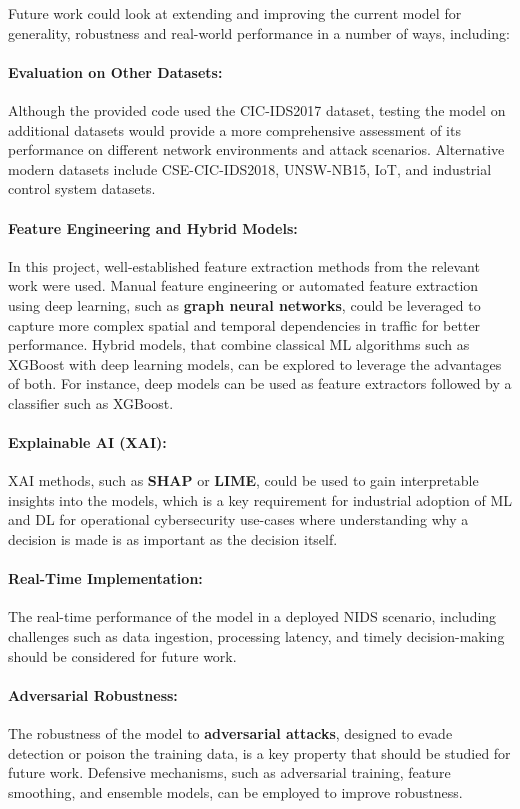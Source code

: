Future work could look at extending and improving the current model for generality, robustness and real-world performance in a number of ways, including:

\paragraph{Evaluation on Other Datasets: } Although the provided code used the CIC-IDS2017 dataset, testing the model on additional datasets would provide a more comprehensive assessment of its performance on different network environments and attack scenarios. Alternative modern datasets include CSE-CIC-IDS2018, UNSW-NB15, IoT, and industrial control system datasets.

\paragraph{Feature Engineering and Hybrid Models: } In this project, well-established feature extraction methods from the relevant work were used. Manual feature engineering or automated feature extraction using deep learning, such as \textbf{graph neural networks}, could be leveraged to capture more complex spatial and temporal dependencies in traffic for better performance. Hybrid models, that combine classical ML algorithms such as XGBoost with deep learning models, can be explored to leverage the advantages of both. For instance, deep models can be used as feature extractors followed by a classifier such as XGBoost.

\paragraph{Explainable AI (XAI): } XAI methods, such as \textbf{SHAP} or \textbf{LIME}, could be used to gain interpretable insights into the models, which is a key requirement for industrial adoption of ML and DL for operational cybersecurity use-cases where understanding why a decision is made is as important as the decision itself.

\paragraph{Real-Time Implementation: } The real-time performance of the model in a deployed NIDS scenario, including challenges such as data ingestion, processing latency, and timely decision-making should be considered for future work.

\paragraph{Adversarial Robustness: } The robustness of the model to \textbf{adversarial attacks}, designed to evade detection or poison the training data, is a key property that should be studied for future work. Defensive mechanisms, such as adversarial training, feature smoothing, and ensemble models, can be employed to improve robustness.

